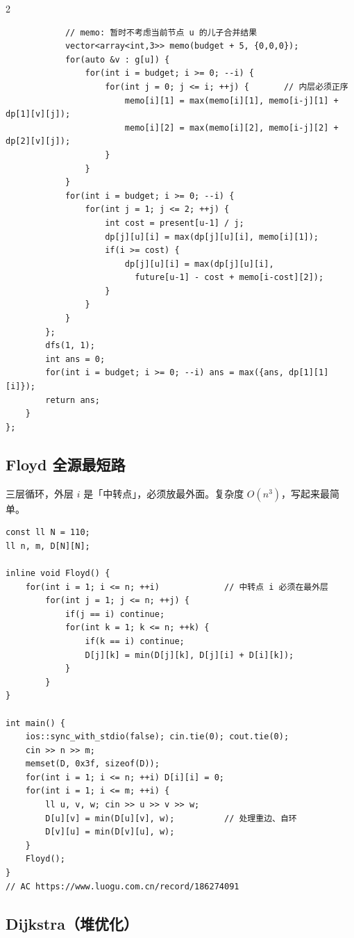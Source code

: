 \begin{multicols*}{2}
\begin{verbatim}
            // memo: 暂时不考虑当前节点 u 的儿子合并结果
            vector<array<int,3>> memo(budget + 5, {0,0,0});
            for(auto &v : g[u]) {
                for(int i = budget; i >= 0; --i) {
                    for(int j = 0; j <= i; ++j) {       // 内层必须正序
                        memo[i][1] = max(memo[i][1], memo[i-j][1] + dp[1][v][j]);
                        memo[i][2] = max(memo[i][2], memo[i-j][2] + dp[2][v][j]);
                    }
                }
            }
            for(int i = budget; i >= 0; --i) {
                for(int j = 1; j <= 2; ++j) {
                    int cost = present[u-1] / j;
                    dp[j][u][i] = max(dp[j][u][i], memo[i][1]);
                    if(i >= cost) {
                        dp[j][u][i] = max(dp[j][u][i],
                          future[u-1] - cost + memo[i-cost][2]);
                    }
                }
            }
        };
        dfs(1, 1);
        int ans = 0;
        for(int i = budget; i >= 0; --i) ans = max({ans, dp[1][1][i]});
        return ans;
    }
};
		\end{verbatim}


		\subsection{Floyd 全源最短路}

		三层循环，外层 $i$ 是「中转点」，必须放最外面。复杂度 $O(n^3)$，写起来最简单。

		\begin{verbatim}
const ll N = 110;
ll n, m, D[N][N];

inline void Floyd() {
    for(int i = 1; i <= n; ++i)             // 中转点 i 必须在最外层
        for(int j = 1; j <= n; ++j) {
            if(j == i) continue;
            for(int k = 1; k <= n; ++k) {
                if(k == i) continue;
                D[j][k] = min(D[j][k], D[j][i] + D[i][k]);
            }
        }
}

int main() {
    ios::sync_with_stdio(false); cin.tie(0); cout.tie(0);
    cin >> n >> m;
    memset(D, 0x3f, sizeof(D));
    for(int i = 1; i <= n; ++i) D[i][i] = 0;
    for(int i = 1; i <= m; ++i) {
        ll u, v, w; cin >> u >> v >> w;
        D[u][v] = min(D[u][v], w);          // 处理重边、自环
        D[v][u] = min(D[v][u], w);
    }
    Floyd();
}
// AC https://www.luogu.com.cn/record/186274091
		\end{verbatim}


		\subsection{Dijkstra（堆优化）}


\end{multicols*}
